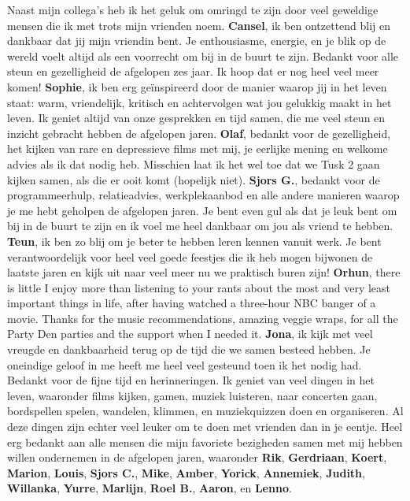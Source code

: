 Naast mijn collega's heb ik het geluk om omringd te zijn door veel geweldige mensen die ik met trots mijn vrienden noem. \newline
\textbf{Cansel}, ik ben ontzettend blij en dankbaar dat jij mijn vriendin bent. Je enthousiasme, energie, en je blik op de wereld voelt altijd als een voorrecht om bij in de buurt te zijn. Bedankt voor alle steun en gezelligheid de afgelopen zes jaar. Ik hoop dat er nog heel veel meer komen! \newline 
\textbf{Sophie}, ik ben erg ge\"{i}nspireerd door de manier waarop jij in het leven staat: warm, vriendelijk, kritisch en achtervolgen wat jou gelukkig maakt in het leven. Ik geniet altijd van onze gesprekken en tijd samen, die me veel steun en inzicht gebracht hebben de afgelopen jaren. \newline 
\textbf{Olaf}, bedankt voor de gezelligheid, het kijken van rare en depressieve films met mij, je eerlijke mening en welkome advies als ik dat nodig heb. Misschien laat ik het wel toe dat we Tusk 2 gaan kijken samen, als die er ooit komt (hopelijk niet). \newline
\textbf{Sjors G.}, bedankt voor de programmeerhulp, relatieadvies, werkplekaanbod en alle andere manieren waarop je me hebt geholpen de afgelopen jaren. Je bent even gul als dat je leuk bent om bij in de buurt te zijn en ik voel me heel dankbaar om jou als vriend te hebben. \newline 
\textbf{Teun}, ik ben zo blij om je beter te hebben leren kennen vanuit werk. Je bent verantwoordelijk voor heel veel goede feestjes die ik heb mogen bijwonen de laatste jaren en kijk uit naar veel meer nu we praktisch buren zijn! \newline
\textbf{Orhun}, there is little I enjoy more than listening to your rants about the most and very least important things in life, after having watched a three-hour NBC banger of a movie. Thanks for the music recommendations, amazing veggie wraps, for all the Party Den parties and the support when I needed it. \newline 
\textbf{Jona}, ik kijk met veel vreugde en dankbaarheid terug op de tijd die we samen besteed hebben. Je oneindige geloof in me heeft me heel veel gesteund toen ik het nodig had. Bedankt voor de fijne tijd en herinneringen. \newline 
Ik geniet van veel dingen in het leven, waaronder films kijken, gamen, muziek luisteren, naar concerten gaan, bordspellen spelen, wandelen, klimmen, en muziekquizzen doen en organiseren. Al deze dingen zijn echter veel leuker om te doen met vrienden dan in je eentje. Heel erg bedankt aan alle mensen die mijn favoriete bezigheden samen met mij hebben willen ondernemen in de afgelopen jaren, waaronder \textbf{Rik}, \textbf{Gerdriaan}, \textbf{Koert}, \textbf{Marion}, \textbf{Louis}, \textbf{Sjors C.}, \textbf{Mike}, \textbf{Amber}, \textbf{Yorick}, \textbf{Annemiek}, \textbf{Judith}, \textbf{Willanka}, \textbf{Yurre}, \textbf{Marlijn}, \textbf{Roel B.}, \textbf{Aaron}, en \textbf{Lenno}. \newline
